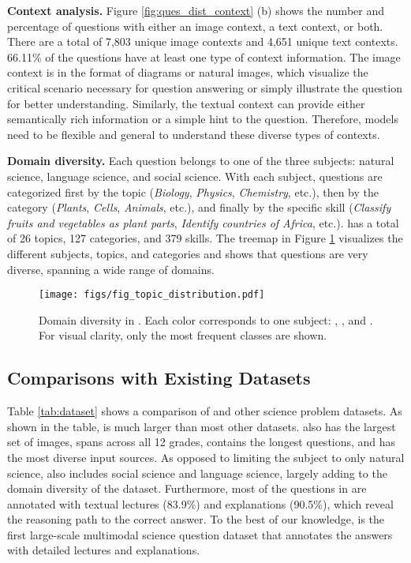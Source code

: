 \noindent \textbf{Context analysis.}
Figure \ref{fig:ques_dist_context} (b) shows the number and percentage of questions with either an image context, a text context, or both. There are a total of 7,803 unique image contexts and 4,651 unique text contexts. 66.11\% of the questions have at least one type of context information. The image context is in the format of diagrams or natural images, which visualize the critical scenario necessary for question answering or simply illustrate the question for better understanding. Similarly, the textual context can provide either semantically rich information or a simple hint to the question. 
Therefore, models need to be flexible and general to understand these diverse types of contexts.


\noindent \textbf{Domain diversity.}
Each \name{} question belongs to one of the three subjects: natural science, language science, and social science. With each subject, questions are categorized first by the topic (\textit{Biology}, \textit{Physics}, \textit{Chemistry}, etc.), then by the category (\textit{Plants}, \textit{Cells}, \textit{Animals}, etc.), and finally by the specific skill (\textit{Classify fruits and vegetables as plant parts}, \textit{Identify countries of Africa}, etc.). \name{} has a total of 26 topics, 127 categories, and 379 skills. The treemap in Figure \ref{fig:sub_tree} visualizes the different subjects, topics, and categories and shows that \name{} questions are very diverse, spanning a wide range of domains.


\begin{figure}[t!]
 \centering
 \texttt{[image: figs/fig\_topic\_distribution.pdf]}
 \caption{Domain diversity in \name{}. Each color corresponds to one subject: , , and . For visual clarity, only the most frequent classes are shown.}
\label{fig:sub_tree}
\end{figure}

\subsection{Comparisons with Existing Datasets}
Table \ref{tab:dataset} shows a comparison of \name{} and other science problem datasets. As shown in the table, \name{} is much larger than most other datasets. \name{} also has the largest set of images, spans across all 12 grades, contains the longest questions, and has the most diverse input sources. As opposed to limiting the subject to only natural science, \name{} also includes social science and language science, largely adding to the domain diversity of the dataset. Furthermore, most of the questions in \name{} are annotated with textual lectures (83.9\%) and explanations (90.5\%), which reveal the reasoning path to the correct answer. To the best of our knowledge, \name{} is the first large-scale multimodal science question dataset that annotates the answers with detailed lectures and explanations.

